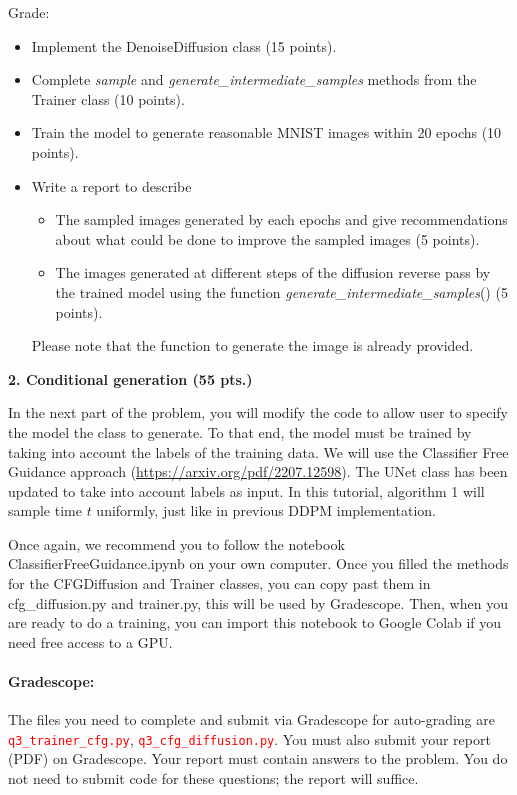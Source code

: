 \documentclass[12pt]{article}
\theoremstyle{definition}
\begin{document}
Grade:
\begin{itemize}
    \item Implement the DenoiseDiffusion class (15 points).
    \item  Complete \textit{sample} and  \textit{generate\_intermediate\_samples} methods from the Trainer class (10 points).
    \item Train the model to generate reasonable MNIST images within 20 epochs (10 points).
    \item Write a report to describe
    \begin{itemize}
        \item The sampled images generated by each epochs and give recommendations about what could be done to improve the sampled images (5 points).
        \item The images generated at different steps of the diffusion reverse pass by the trained model  using the  function \textit{generate\_intermediate\_samples}()   (5 points).
    \end{itemize}
Please note that the function to generate the image is already provided.
\end{itemize}


\textbf{2. Conditional generation (55 pts.)}

In the next part of the problem, you will modify the code to allow user to specify the model the class to generate. To that end, the model must be trained by taking into account the labels of the training data. We will use the Classifier Free Guidance approach  (\url{https://arxiv.org/pdf/2207.12598}). The UNet class has been updated to take into account labels as input. In this tutorial, algorithm 1 will sample time $t$ uniformly, just like in previous DDPM implementation.  

Once again, we recommend you to follow the notebook ClassifierFreeGuidance.ipynb  on your own computer. Once you filled the methods for the CFGDiffusion and Trainer classes, you can copy past them in cfg\_diffusion.py and trainer.py, this will be used by Gradescope. Then, when you are ready to do a training, you can import this notebook to Google Colab if you need free access to a GPU.

\paragraph{Gradescope:}

The files you need to complete and submit via Gradescope for auto-grading are \textcolor{red}{\texttt{q3\_trainer\_cfg.py}}, \textcolor{red}{\texttt{q3\_cfg\_diffusion.py}}.
You must also submit your report (PDF) on Gradescope. Your report must contain answers to the problem. You do not need to submit code for these questions; the report will suffice.
\end{document}

